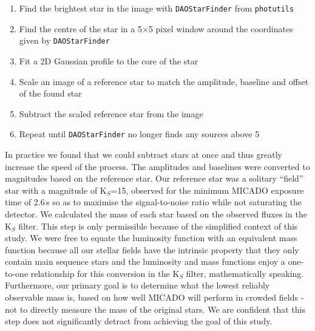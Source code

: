 \begin{enumerate}
    \item Find the brightest star in the image with \verb+DAOStarFinder+ from \verb+photutils+ \citep{photutils}
    \item Find the centre of the star in a 5$\times$5 pixel window around the coordinates given by \verb+DAOStarFinder+
    \item Fit a 2D Gaussian profile to the core of the star
    \item Scale an image of a reference star to match the amplitude, baseline and offset of the found star
    \item Subtract the scaled reference star from the image
    \item Repeat until \verb+DAOStarFinder+ no longer finds any sources above 5\,\sig
\end{enumerate}

In practice we found that we could subtract  stars at once and thus greatly increase the speed of the process. 
The amplitudes and baselines were converted to magnitudes based on the reference star. 
Our reference star was a solitary ``field'' star with a magnitude of K$_S$=15, observed for the minimum {MICADO} exposure time of 2.6\,s so as to maximise the signal-to-noise ratio while not saturating the detector. 
We calculated the mass of each star based on the observed fluxes in the K$_S$ filter. 
This step is only permissible because of the simplified context of this study. 
We were free to equate the luminosity function with an equivalent mass function because all our stellar fields have the intrinsic property that they only contain main sequence stars and the luminosity and mass functions enjoy a one-to-one relationship for this conversion in the K$_S$ filter, mathematically speaking. 
Furthermore, our primary goal is to determine what the lowest reliably observable mass is, based on how well MICADO will perform in crowded fields - not to directly measure the mass of the original stars. 
We are confident that this step does not significantly detract from achieving the goal of this study.


